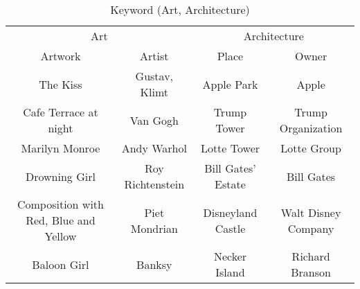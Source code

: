 \begin{table}[ht]
\vspace{-0.1in}
\caption{Keyword (Art, Architecture)}
\label{table:table_keyword2}
\centering
    \begin{adjustbox}{width=1\linewidth}
        \small 
        \begin{tabular}{cccc}
        \toprule
        \multicolumn{2}{c|}{Art}                                                                                                                                                          & \multicolumn{2}{c}{Architecture}                                          \\
        \multicolumn{1}{c}{Artwork}                                                                                                         & \multicolumn{1}{c|}{Artist}                                                        & Place                                          & Owner                    \\ \midrule
        \multicolumn{1}{c|}{{\color[HTML]{1F1F1F} The Kiss}}                                                             & \multicolumn{1}{c|}{Gustav, Klimt}                            & \multicolumn{1}{c|}{Apple Park}                & Apple                    \\
        \multicolumn{1}{c|}{{\color[HTML]{1F1F1F} Cafe Terrace at night}}                                                & \multicolumn{1}{c|}{Van Gogh}                                 & \multicolumn{1}{c|}{Trump Tower}               & Trump Organization       \\
        \multicolumn{1}{c|}{{\color[HTML]{1F1F1F} Marilyn Monroe}}                                                       & \multicolumn{1}{c|}{Andy Warhol}                              & \multicolumn{1}{c|}{Lotte Tower}               & Lotte Group              \\
        \multicolumn{1}{c|}{{\color[HTML]{1F1F1F} Drowning Girl}}                                                        & \multicolumn{1}{c|}{Roy Richtenstein}                         & \multicolumn{1}{c|}{Bill Gates' Estate}        & Bill Gates               \\
        \multicolumn{1}{c|}{Composition with Red, Blue and Yellow}                                                       & \multicolumn{1}{c|}{Piet Mondrian}                            & \multicolumn{1}{c|}{Disneyland Castle}         & Walt Disney Company      \\
        \multicolumn{1}{c|}{Baloon Girl}                                                                                 & \multicolumn{1}{c|}{Banksy}                                   & \multicolumn{1}{c|}{Necker Island}             & Richard Branson          \\

\end{tabular}
\end{adjustbox}
\end{table}
